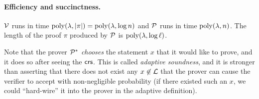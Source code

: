 \begin{definition} 
    \paragraph{Efficiency and succinctness.} $\mathcal{V}$ runs in time $\operatorname{poly}(\lambda, |\pi|) = \operatorname{poly}(\lambda, \log n)$
    and $\mathcal{P}$ runs in time $\operatorname{poly}(\lambda, n)$.
	The length of the proof $\pi$ produced by $\mathcal{P}$ is $\operatorname{poly}(\lambda, \log \ell)$.

\end{definition}
Note that the prover $\mathcal{P}^*$ \emph{chooses} the statement $x$ that
it would like to prove, and it does so after seeing the $\mathsf{crs}$.
This is called \emph{adaptive soundness}, and it is stronger than asserting that there does not exist any $x \not \in \mathcal{L}$
that the prover can cause the verifier to accept with non-negligible probability
(if there existed such an $x$, we could ``hard-wire''
it into the prover in the adaptive definition).

